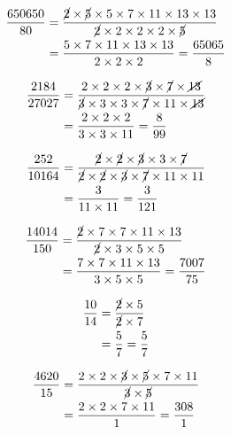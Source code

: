 {{\item\begin{align*}
    \dfrac{650650}{80} &=
    \dfrac{\cancel{2} \times \cancel{5} \times 5 \times 7 \times 11 \times 13 \times 13}
    {\cancel{2} \times 2 \times 2 \times 2 \times \cancel{5}}\\ &=
    \dfrac{5 \times 7 \times 11 \times 13 \times 13}
    {2 \times 2 \times 2} =
    \dfrac{65065}{8}
    \end{align*}

\item\begin{align*}
    \dfrac{2184}{27027} &=
    \dfrac{2 \times 2 \times 2 \times \cancel{3} \times \cancel{7} \times \cancel{13}}
    {\cancel{3} \times 3 \times 3 \times \cancel{7} \times 11 \times \cancel{13}}\\ &=
    \dfrac{2 \times 2 \times 2}
    {3 \times 3 \times 11} =
    \dfrac{8}{99}
    \end{align*}

\item\begin{align*}
    \dfrac{252}{10164} &=
    \dfrac{\cancel{2} \times \cancel{2} \times \cancel{3} \times 3 \times \cancel{7}}
    {\cancel{2} \times \cancel{2} \times \cancel{3} \times \cancel{7} \times 11 \times 11}\\ &=
    \dfrac{3}
    {11 \times 11} =
    \dfrac{3}{121}
    \end{align*}

\item\begin{align*}
    \dfrac{14014}{150} &=
    \dfrac{\cancel{2} \times 7 \times 7 \times 11 \times 13}
    {\cancel{2} \times 3 \times 5 \times 5}\\ &=
    \dfrac{7 \times 7 \times 11 \times 13}
    {3 \times 5 \times 5} =
    \dfrac{7007}{75}
    \end{align*}

\item\begin{align*}
    \dfrac{10}{14} &=
    \dfrac{\cancel{2} \times 5}
    {\cancel{2} \times 7}\\ &=
    \dfrac{5}
    {7} =
    \dfrac{5}{7}
    \end{align*}

\item\begin{align*}
    \dfrac{4620}{15} &=
    \dfrac{2 \times 2 \times \cancel{3} \times \cancel{5} \times 7 \times 11}
    {\cancel{3} \times \cancel{5}}\\ &=
    \dfrac{2 \times 2 \times 7 \times 11}
    {1} =
    \dfrac{308}{1}
    \end{align*}

}}
